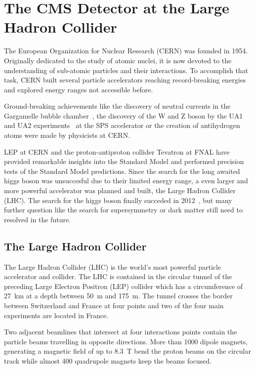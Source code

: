 
\chapter{The CMS Detector at the Large Hadron Collider}

The European Organization for Nuclear Research (CERN) was founded in 1954.
Originally dedicated to the study of atomic nuclei, it is now devoted to
the understanding of sub-atomic particles and their interactions. To accomplish that task, CERN
built several particle accelerators reaching record-breaking energies and
explored energy ranges not accessible before.

Ground-breaking achievements like the discovery of neutral currents in the
Gargamelle bubble chamber~\cite{Hasert:1973ff}, the discovery of the W and Z
boson by the UA1 and UA2 experiments~\cite{Arnison:1983rp} at the SPS
accelerator or the creation of antihydrogen atoms were made by physicists at
CERN.

LEP at CERN and the proton-antiproton collider Tevatron at FNAL have provided
remarkable insights into the Standard Model and performed precision tests of the
Standard Model predictions. Since the search for the long awaited higgs boson
was unsuccesful due to their limited energy range, a even larger and more
powerful accelerator was planned and built, the Large Hadron Collider (LHC). The
search for the higgs boson finally succeded in 2012~\cite{Chatrchyan:2012xdj},
but many further question like the search for supersymmetry or dark matter still
need to resolved in the future.

\section{The Large Hadron Collider}

The Large Hadron Collider (LHC) is the world's most powerful particle
accelerator and collider. The LHC is contained in the circular tunnel of the
preceding Large Electron Positron (LEP) collider which has a circumference of
\SI{27}{\kilo \meter} at a depth between \SI{50}{\meter} and \SI{175}{\meter}.
The tunnel crosses the border between Switzerland and France at four points and
two of the four main experiments are located in France. 

Two adjacent beamlines that intersect at four interactions points contain the
particle beams travelling in opposite directions. More than 1000 dipole magnets,
generating a magnetic field of up to \SI{8.3}{\tesla} bend the proton beams on
the circular track while almost 400 quadrupole magnets keep the beams focused. 

